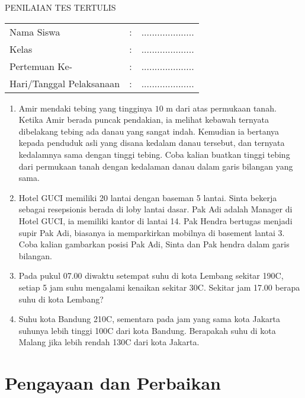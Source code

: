 \documentclass[a5paper,10pt,openany]{book}
\begin{document}
{\newpage
\begin{center}
PENILAIAN TES TERTULIS	
\end{center}
	\begin{tabular}{p{4cm}p{.15cm}p{4cm}}
	Nama Siswa&:& ....................\\
	Kelas&:& ....................\\
	Pertemuan Ke-&:& ....................\\
	Hari/Tanggal Pelaksanaan&:& ....................\\
\end{tabular}
	\begin{enumerate}[1.]
	\item Amir mendaki tebing yang tingginya $10$ m dari atas permukaan tanah. Ketika Amir berada puncak pendakian, ia melihat kebawah ternyata dibelakang tebing ada danau yang sangat indah. Kemudian ia bertanya kepada penduduk asli yang disana kedalam danau tersebut, dan ternyata kedalamnya sama dengan tinggi tebing. Coba kalian buatkan tinggi tebing dari permukaan tanah dengan kedalaman danau dalam garis bilangan yang sama. 
	\item Hotel GUCI memiliki 20 lantai dengan baseman 5 lantai. Sinta bekerja sebagai resepsionis berada di loby lantai dasar. Pak Adi adalah Manager di Hotel GUCI, ia memiliki kantor di lantai 14. Pak Hendra bertugas menjadi supir Pak Adi, biasanya ia memparkirkan mobilnya di basement lantai 3. Coba kalian gambarkan posisi Pak Adi, Sinta dan Pak hendra dalam garis bilangan.
	\item Pada pukul 07.00 diwaktu setempat suhu di kota Lembang sekitar 190C, setiap 5 jam suhu mengalami kenaikan sekitar 30C. Sekitar jam 17.00 berapa suhu di kota Lembang?
	\item Suhu kota Bandung 210C, sementara pada jam yang sama kota Jakarta suhunya lebih tinggi 100C dari kota Bandung. Berapakah suhu di kota Malang jika lebih rendah 130C dari kota Jakarta.
\end{enumerate}
}
\newpage
\section{Pengayaan dan Perbaikan}
\end{document}
